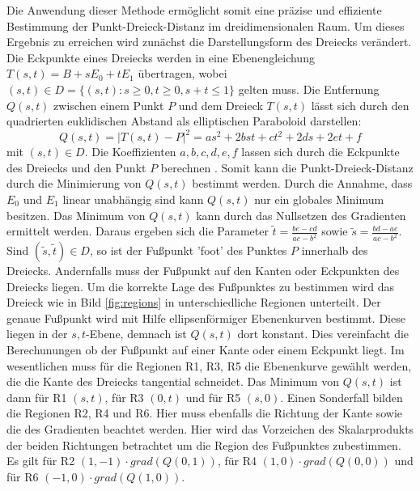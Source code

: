 \documentclass[conference]{IEEEtran}
\begin{document}
Die Anwendung dieser Methode ermöglicht somit eine präzise und effiziente Bestimmung der Punkt-Dreieck-Distanz im dreidimensionalen Raum.
Um dieses Ergebnis zu erreichen wird zunächst die Darstellungsform des Dreiecks verändert. Die Eckpunkte eines Dreiecks werden in eine Ebenengleichung $ T(s,t) = B + sE_0 + tE_1 $ übertragen, wobei $(s, t) \in D = \{(s,t): s \geq 0, t \geq 0, s + t \leq 1 \}$ gelten muss. Die Entfernung $Q(s,t)$ zwischen einem Punkt $P$ und dem Dreieck $T(s,t)$ lässt sich durch den quadrierten euklidischen Abstand als elliptischen Paraboloid darstellen: 
\begin{equation}
    Q(s,t) = |T(s,t) - P|^2 = as^2 + 2bst + ct^2 + 2ds + 2et + f
\end{equation}
mit $(s,t) \in D$. Die Koeffizienten $a, b, c, d, e, f$ lassen sich durch die Eckpunkte des Dreiecks und den Punkt $P$ berechnen \autocite*{eberlyDistancePointTriangle}. Somit kann die Punkt-Dreieck-Distanz durch die Minimierung von $Q(s,t)$ bestimmt werden. Durch die Annahme, dass $E_0$ und $E_1$ linear unabhängig sind kann $Q(s,t)$ nur ein globales Minimum besitzen. Das Minimum von $Q(s,t)$ kann durch das Nullsetzen des Gradienten  ermittelt werden. Daraus ergeben sich die Parameter $\tilde{t} = \frac{be-cd}{ac-b^2}$ sowie $\tilde{s} = \frac{bd-ae}{ac-b^2}$. Sind $(\tilde{s}, \tilde{t}) \in D$, so ist der Fußpunkt 'foot' des Punktes $P$ innerhalb des Dreiecks. Andernfalls muss der Fußpunkt auf den Kanten oder Eckpunkten des Dreiecks liegen. Um die korrekte Lage des Fußpunktes zu bestimmen wird das Dreieck wie in Bild \ref{fig:regions} in unterschiedliche Regionen unterteilt. Der genaue Fußpunkt wird mit Hilfe ellipsenförmiger Ebenenkurven bestimmt. Diese liegen in der $s, t$-Ebene, demnach ist $Q(s, t)$ dort konstant. Dies vereinfacht die Berechunungen ob der Fußpunkt auf einer Kante oder einem Eckpunkt liegt. Im wesentlichen muss für die Regionen R1, R3, R5 die Ebenenkurve gewählt werden, die die Kante des Dreiecks tangential schneidet. Das Minimum von $Q(s, t)$ ist dann für R1 $(s, t)$, für R3 $(0, t)$ und für R5 $(s, 0)$. Einen Sonderfall bilden die Regionen R2, R4 und R6. Hier muss ebenfalls die Richtung der Kante sowie die des Gradienten beachtet werden. Hier wird das Vorzeichen des Skalarprodukts der beiden Richtungen betrachtet um die Region des Fußpunktes zubestimmen. Es gilt für R2 $(1, -1) \cdot grad(Q(0, 1))$, für R4 $(1, 0) \cdot grad(Q(0, 0))$ und für R6 $(-1, 0) \cdot grad(Q(1, 0))$. 
\end{document}
